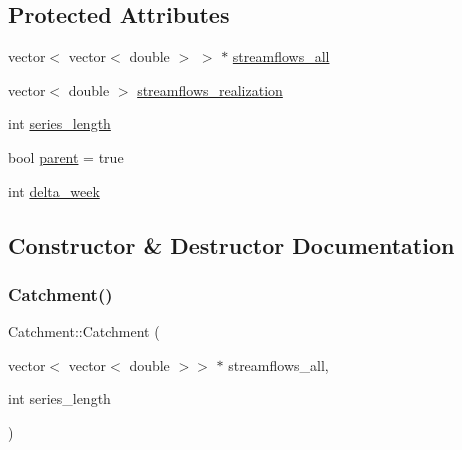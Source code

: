 \subsection*{Protected Attributes}
\begin{DoxyCompactItemize}
\item 
vector$<$ vector$<$ double $>$ $>$ $\ast$ \mbox{\hyperlink{classCatchment_a579ccda86831f286c19c76354e7125c3_a579ccda86831f286c19c76354e7125c3}{streamflows\+\_\+all}}
\item 
vector$<$ double $>$ \mbox{\hyperlink{classCatchment_aaf04c295ecd6b666fa1439d3d5bc072a_aaf04c295ecd6b666fa1439d3d5bc072a}{streamflows\+\_\+realization}}
\item 
int \mbox{\hyperlink{classCatchment_a2d4994220f63b876348b4ce4892bc6d3_a2d4994220f63b876348b4ce4892bc6d3}{series\+\_\+length}}
\item 
bool \mbox{\hyperlink{classCatchment_a472ff6892f90d94b8c4dba53c462dedf_a472ff6892f90d94b8c4dba53c462dedf}{parent}} = true
\item 
int \mbox{\hyperlink{classCatchment_a20548a9d03f0d39f297cb15b3c0433ad_a20548a9d03f0d39f297cb15b3c0433ad}{delta\+\_\+week}}
\end{DoxyCompactItemize}


\subsection{Constructor \& Destructor Documentation}
\mbox{\label{classCatchment_aafdee6ee868a8892314672abb119e60f_aafdee6ee868a8892314672abb119e60f}} 
\subsubsection{\texorpdfstring{Catchment()}{Catchment()}\hspace{0.1cm}{\footnotesize\ttfamily [1/2]}}
{\footnotesize\ttfamily Catchment\+::\+Catchment (\begin{DoxyParamCaption}\item[{vector$<$ vector$<$ double $>$$>$ $\ast$}]{streamflows\+\_\+all,  }\item[{int}]{series\+\_\+length }\end{DoxyParamCaption})}

\mbox{\label{classCatchment_ae311c4b2d857a8b5abc01f5317b04df2_ae311c4b2d857a8b5abc01f5317b04df2}} 
